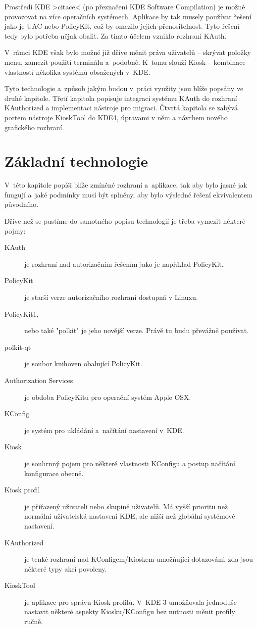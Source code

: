 Prostředí KDE >citace< (po přeznačení KDE Software Compilation) je možné provozovat na více operačních systémech. Aplikace by tak musely používat řešení jako je UAC nebo PolicyKit, což by omezilo jejich přenositelnost. Tyto řešení tedy bylo potřeba nějak obalit. Za tímto účelem vzniklo rozhraní KAuth.

V~rámci KDE však bylo možné již dřive měnit práva uživatelů -- skrývat položky menu, zamezit použití terminálu a~podobně. K~tomu slouží Kiosk -- kombinace vlastností několika systémů obsažených v~KDE.

Tyto technologie a~způsob jakým budou v~práci využity jsou blíže popsány ve druhé kapitole. Třetí kapitola popisuje integraci systému KAuth do rozhraní KAuthorized a implementaci nástroje pro migraci. Čtvrtá kapitola se zabývá portem nástroje KioskTool do KDE4, úpravami v něm a návrhem nového grafického rozhraní.

\chapter{Základní technologie}
V~této kapitole popíši blíže zmíněné rozhraní a~aplikace, tak aby bylo jasné jak fungují a~jaké podmínky musí být splněny, aby bylo výsledné řešení ekvivalentem původního.

Dříve než se pustíme do samotného popisu technologií je třeba vymezit některé pojmy:
\begin{description}
\item[KAuth] je rozhraní nad autorizačním řešením jako je například PolicyKit.
\item[PolicyKit] je starší verze autorizačního rozhraní dostupná v Linuxu.
\item[PolicyKit1,] nebo také "polkit" je jeho novější verze. Právě tu budu převážně používat.
\item[polkit-qt] je soubor knihoven obalující PolicyKit.
\item[Authorization Services] je obdoba PolicyKitu pro operační systém Apple OSX.
\item[KConfig] je systém pro ukládání a~načítání nastavení v~KDE.
\item[Kiosk] je souhrnný pojem pro některé vlastnosti KConfigu a postup načítání konfigurace obecně.
\item[Kiosk profil] je přiřazený uživateli nebo skupině uživatelů. Má vyšší prioritu než normální uživatelská nastavení KDE, ale nižší než globální systémové nastavení.
\item[KAuthorized] je tenké rozhraní nad KConfigem/Kioskem umožňující dotazování, zda jsou některé typy akcí povoleny.
\item[KioskTool] je aplikace pro správu Kiosk profilů. V~KDE 3 umožňovala jednoduše nastavit některé aspekty Kiosku/KConfigu bez nutnosti měnit profily ručně.
\end{description}

